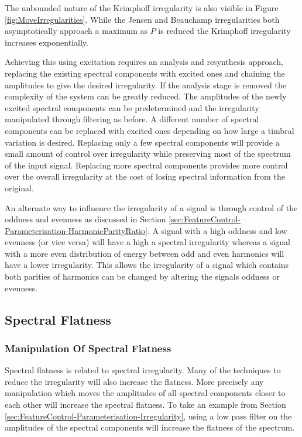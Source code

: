 			The unbounded nature of the Krimphoff irregularity is also visible in Figure
			\ref{fig:MoveIrregularities}. While the Jensen and Beauchamp irregularities both asymptotically
			approach a maximum as $P$ is reduced the Krimphoff irregularity increases exponentially.

			Achieving this using excitation requires an analysis and resynthesis approach, replacing the
			existing spectral components with excited ones and chaining the amplitudes to give the desired
			irregularity.  If the analysis stage is removed the complexity of the system can be greatly
			reduced. The amplitudes of the newly excited spectral components can be predetermined and the
			irregularity manipulated through filtering as before. A different number of spectral components can
			be replaced with excited ones depending on how large a timbral variation is desired. Replacing only
			a few spectral components will provide a small amount of control over irregularity while preserving
			most of the spectrum of the input signal. Replacing more spectral components provides more control
			over the overall irregularity at the cost of losing spectral information from the original.

			An alternate way to influence the irregularity of a signal is through control of the oddness and
			evenness as discussed in Section \ref{sec:FeatureControl-Parameterisation-HarmonicParityRatio}. A
			signal with a high oddness and low evenness (or vice versa) will have a high a spectral
			irregularity whereas a signal with a more even distribution of energy between odd and even
			harmonics will have a lower irregularity. This allows the irregularity of a signal which contains
			both parities of harmonics can be changed by altering the signals oddness or evenness.

	\subsection{Spectral Flatness}
	\label{sec:FeatureControl-Parameterisation-Flatness}
		\subsubsection*{Manipulation Of Spectral Flatness}
			Spectral flatness is related to spectral irregularity. Many of the techniques to reduce the
			irregularity will also increase the flatness. More precisely any manipulation which moves the
			amplitudes of all spectral components closer to each other will increase the spectral flatness. To
			take an example from Section \ref{sec:FeatureControl-Parameterisation-Irregularity}, using a low
			pass filter on the amplitudes of the spectral components will increase the flatness of the
			spectrum.

